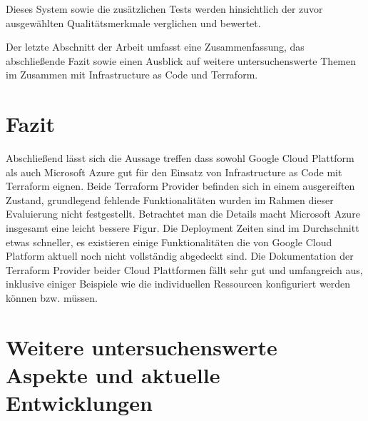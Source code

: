 \begin{spacing}{1.2}
Dieses System sowie die zusätzlichen Tests werden hinsichtlich der zuvor
ausgewählten Qualitätsmerkmale verglichen und bewertet.

Der letzte Abschnitt der Arbeit umfasst eine Zusammenfassung, 
das abschließende Fazit sowie einen Ausblick auf weitere
untersuchenswerte Themen im Zusammen mit Infrastructure as Code
und Terraform. 

\section{Fazit}

Abschließend lässt sich die Aussage treffen dass sowohl Google Cloud
Plattform als auch Microsoft Azure gut für den Einsatz von Infrastructure
as Code mit Terraform eignen. Beide Terraform Provider befinden sich
in einem ausgereiften Zustand, grundlegend fehlende Funktionalitäten
wurden im Rahmen dieser Evaluierung nicht festgestellt.
Betrachtet man die Details macht Microsoft Azure insgesamt eine
leicht bessere Figur. Die Deployment Zeiten sind im Durchschnitt
etwas schneller, es existieren einige Funktionalitäten die von
Google Cloud Platform aktuell noch nicht vollständig abgedeckt sind.
Die Dokumentation der Terraform Provider beider Cloud Plattformen
fällt sehr gut und umfangreich aus, inklusive einiger Beispiele wie
die individuellen Ressourcen konfiguriert werden können bzw. müssen.

\section{Weitere untersuchenswerte Aspekte und aktuelle Entwicklungen}

\end{spacing}
